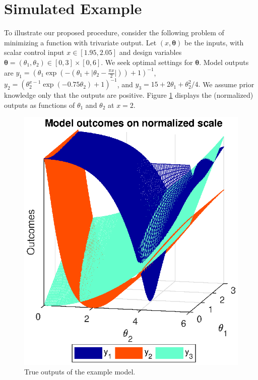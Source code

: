 \documentclass[12pt]{article}
\begin{document}
%
\section{Simulated Example}\label{example}
%

%
To illustrate our proposed procedure, consider the following problem of minimizing a function with trivariate output. 
%
Let $(x,\boldsymbol \theta)$ be the inputs, with scalar control input $x\in[1.95,2.05]$ and design variables $\boldsymbol \theta = (\theta_1,\theta_2)\in[0,3]\times[0,6]$.
%
We seek optimal settings for $\boldsymbol\theta$.
%
Model outputs are
%
$
y_1 = \left(\theta_1 \exp\left(-\left(\theta_1 + \lvert \theta_2-\frac{\pi x}2\rvert \right)\right)+1\right)^{-1}$, 
$
y_2 = \left(\theta_2^{x-1} \exp\left(-0.75 \theta_2\right) + 1 \right)^{-1}
$, and
$
y_3 = 15 + 2 \theta_1 + {\theta_2^2}/4.
$
%
We assume prior knowledge only that the outputs are positive.
%
Figure \ref{fig:toy_sim_outputs} displays the (normalized) outputs as functions of $\theta_1$ and $\theta_2$ at $x = 2$.
%
\begin{figure}
\centering
\includegraphics[scale=.8]{FIG_toy_sim_model_outputs.eps}
\caption{True outputs of the example model.}
\label{fig:toy_sim_outputs}
\end{figure}
\end{document}
